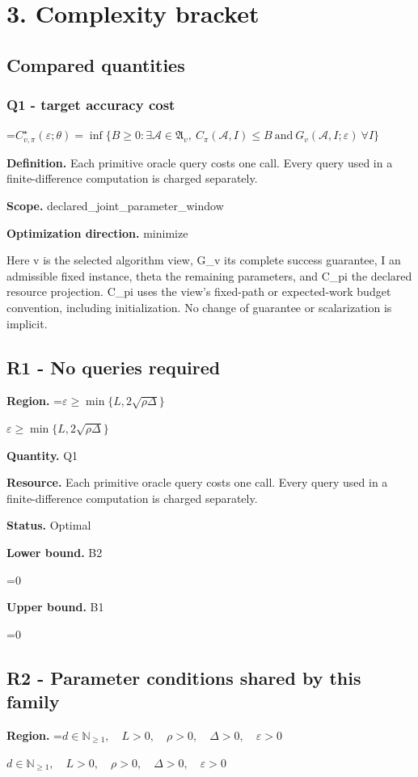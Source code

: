 \documentclass[10pt,a4paper]{article}
\newcommand{\AtlasMath}[1]{\par\begingroup\centering\setbox0=\hbox{$\displaystyle #1$}\ifdim\wd0>1.4\linewidth\typeout{ATLAS WIDE FORMULA: \the\wd0}\fi\ifdim\wd0>\linewidth\resizebox{\linewidth}{!}{\box0}\else\box0\fi\par\endgroup}
\newcommand{\AtlasInlineMath}[1]{\begingroup\setbox0=\hbox{$#1$}\ifdim\wd0>.4\linewidth\endgroup\AtlasMath{#1}\else\endgroup$#1$\fi}
\begin{document}
\section{3. Complexity bracket}
\subsection{Compared quantities}
\subsubsection{Q1 - target accuracy cost}
\AtlasMath{C^\star_{v,\pi}(\varepsilon;\theta)=\inf\{B\ge0:\exists\mathcal A\in\mathfrak A_v,\ C_\pi(\mathcal A,I)\le B\ \text{and}\ G_v(\mathcal A,I;\varepsilon)\ \forall I\}}
\textbf{Definition.} Each primitive oracle query costs one call. Every query used in a finite-difference computation is charged separately.

\textbf{Scope.} declared\_joint\_parameter\_window

\textbf{Optimization direction.} minimize

Here v is the selected algorithm view, G\_v its complete success guarantee, I an admissible fixed instance, theta the remaining parameters, and C\_pi the declared resource projection. C\_pi uses the view's fixed-path or expected-work budget convention, including initialization. No change of guarantee or scalarization is implicit.

\subsection{R1 - No queries required}
\textbf{Region.} \AtlasInlineMath{\varepsilon\ge\min\{L,2\sqrt{\rho\Delta}\}}

\textbf{Quantity.} Q1

\textbf{Resource.} Each primitive oracle query costs one call. Every query used in a finite-difference computation is charged separately.

\textbf{Status.} Optimal

\textbf{Lower bound.} B2

\AtlasMath{0}
\textbf{Upper bound.} B1

\AtlasMath{0}
\subsection{R2 - Parameter conditions shared by this family}
\textbf{Region.} \AtlasInlineMath{d\in\mathbb{N}_{\ge1},\quad L>0,\quad \rho>0,\quad \Delta>0,\quad \varepsilon>0}
\end{document}
